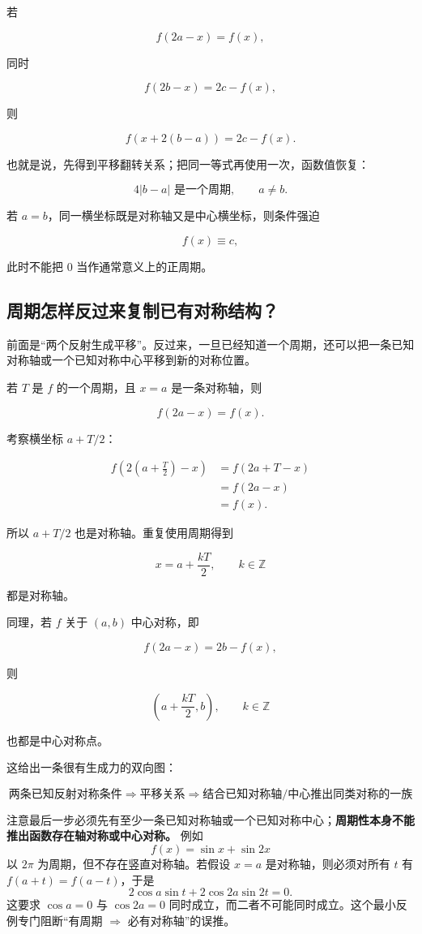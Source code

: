 \documentclass[11pt,a4paper]{ctexart}
\begin{document}
若

\[
f(2a-x)=f(x),
\]

同时

\[
f(2b-x)=2c-f(x),
\]

则

\[
\boxed{f(x+2(b-a))=2c-f(x)}.
\]

也就是说，先得到平移翻转关系；把同一等式再使用一次，函数值恢复：

\[
\boxed{4\lvert b-a\rvert\text{ 是一个周期}},\qquad a\ne b.
\]

若 \(a=b\)，同一横坐标既是对称轴又是中心横坐标，则条件强迫

\[
f(x)\equiv c,
\]

此时不能把 \(0\) 当作通常意义上的正周期。

\subsection{周期怎样反过来复制已有对称结构？}

前面是``两个反射生成平移''。反过来，一旦已经知道一个周期，还可以把一条已知对称轴或一个已知对称中心平移到新的对称位置。

若 \(T\) 是 \(f\) 的一个周期，且 \(x=a\) 是一条对称轴，则

\[
f(2a-x)=f(x).
\]

考察横坐标 \(a+T/2\)：

\[
\begin{aligned}
f\left(2\left(a+\frac T2\right)-x\right)
&=f(2a+T-x)\\
&=f(2a-x)\\
&=f(x).
\end{aligned}
\]

所以 \(a+T/2\) 也是对称轴。重复使用周期得到

\[
\boxed{x=a+\frac{kT}{2},\qquad k\in\mathbb Z}
\]

都是对称轴。

同理，若 \(f\) 关于 \((a,b)\) 中心对称，即

\[
f(2a-x)=2b-f(x),
\]

则

\[
\boxed{\left(a+\frac{kT}{2},b\right),\qquad k\in\mathbb Z}
\]

也都是中心对称点。

这给出一条很有生成力的双向图：

\[
\boxed{
\text{两条已知反射对称条件}
\Longrightarrow
\text{平移关系}
\Longrightarrow
\text{结合已知对称轴/中心推出同类对称的一族}
}
\]

注意最后一步必须先有至少一条已知对称轴或一个已知对称中心；\textbf{周期性本身不能推出函数存在轴对称或中心对称。} 例如
\[
f(x)=\sin x+\sin 2x
\]
以 \(2\pi\) 为周期，但不存在竖直对称轴。若假设 \(x=a\) 是对称轴，则必须对所有 \(t\) 有 \(f(a+t)=f(a-t)\)，于是
\[
2\cos a\sin t+2\cos 2a\sin 2t=0.
\]
这要求 \(\cos a=0\) 与 \(\cos2a=0\) 同时成立，而二者不可能同时成立。这个最小反例专门阻断“有周期 \(\Rightarrow\) 必有对称轴”的误推。
\end{document}
